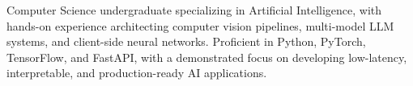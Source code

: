 Computer Science undergraduate specializing in Artificial Intelligence, with hands-on experience architecting computer vision pipelines, multi-model LLM systems, and client-side neural networks. Proficient in Python, PyTorch, TensorFlow, and FastAPI, with a demonstrated focus on developing low-latency, interpretable, and production-ready AI applications.
